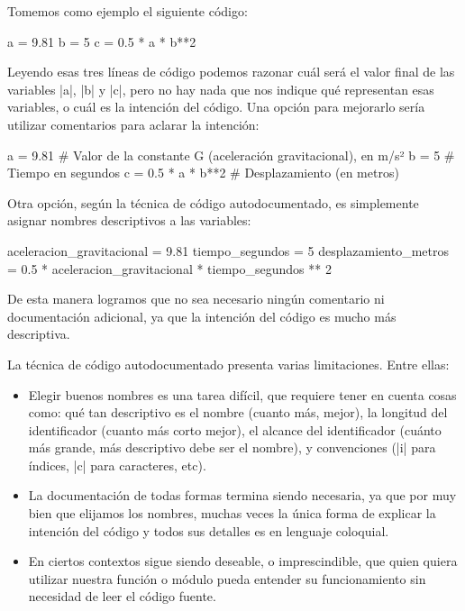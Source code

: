 Tomemos como ejemplo el siguiente código:

\begin{codigo-python-sn}
a = 9.81
b = 5
c = 0.5 * a * b**2
\end{codigo-python-sn}

Leyendo esas tres líneas de código podemos razonar cuál será el valor final de
las variables |a|, |b| y |c|, pero no hay nada que nos indique qué representan
esas variables, o cuál es la intención del código. Una opción para mejorarlo sería
utilizar comentarios para aclarar la intención:

\begin{codigo-python-sn}
a = 9.81   # Valor de la constante G (aceleración gravitacional), en m/s²
b = 5      # Tiempo en segundos
c = 0.5 * a * b**2  # Desplazamiento (en metros)
\end{codigo-python-sn}

Otra opción, según la técnica de código autodocumentado, es simplemente asignar
nombres descriptivos a las variables:

\begin{codigo-python-sn}
aceleracion_gravitacional = 9.81
tiempo_segundos = 5
desplazamiento_metros = 0.5 * aceleracion_gravitacional * tiempo_segundos ** 2
\end{codigo-python-sn}

De esta manera logramos que no sea necesario ningún comentario ni documentación
adicional, ya que la intención del código es mucho más descriptiva.

La técnica de código autodocumentado presenta varias limitaciones. Entre ellas:

\begin{itemize}
    \item Elegir buenos nombres es una tarea difícil, que
        requiere tener en cuenta cosas como: qué tan descriptivo es el nombre
        (cuanto más, mejor), la longitud del identificador
        (cuanto más corto mejor), el alcance del identificador (cuánto más
        grande, más descriptivo debe ser el nombre), y convenciones (|i| para
        índices, |c| para caracteres, etc).
    \item La documentación de todas formas termina siendo necesaria, ya que por
        muy bien que elijamos los nombres, muchas veces la única forma de
        explicar la intención del código y todos sus detalles es en lenguaje
        coloquial.
    \item En ciertos contextos sigue siendo deseable, o imprescindible, que
        quien quiera utilizar nuestra función o módulo pueda entender su
        funcionamiento sin necesidad de leer el código fuente.
\end{itemize}

